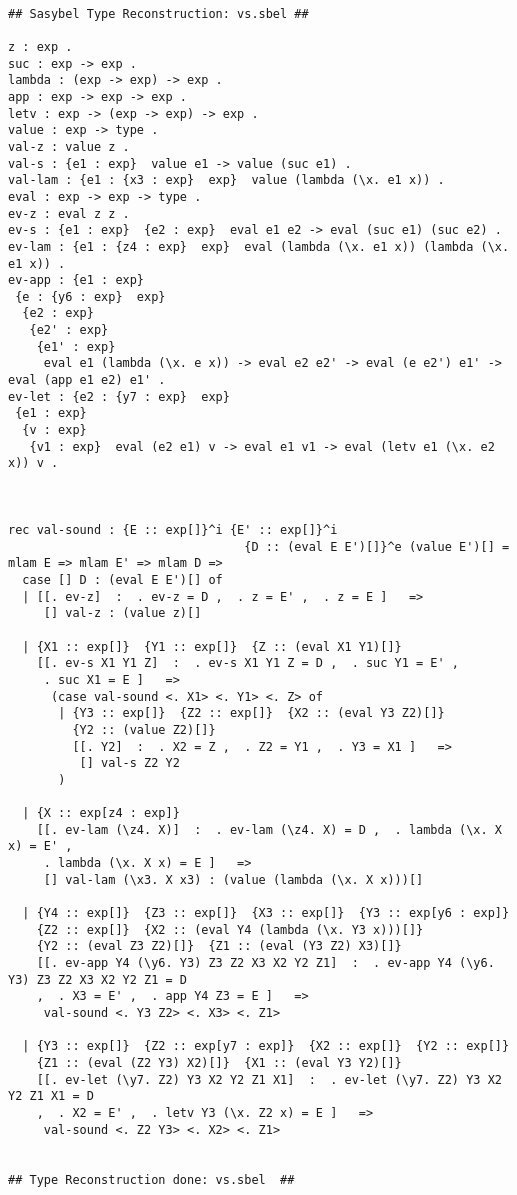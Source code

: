 \documentclass[12pt]{article}
\begin{document}
\footnotesize\begin{verbatim}

## Sasybel Type Reconstruction: vs.sbel ##

z : exp .
suc : exp -> exp .
lambda : (exp -> exp) -> exp .
app : exp -> exp -> exp .
letv : exp -> (exp -> exp) -> exp .
value : exp -> type .
val-z : value z .
val-s : {e1 : exp}  value e1 -> value (suc e1) .
val-lam : {e1 : {x3 : exp}  exp}  value (lambda (\x. e1 x)) .
eval : exp -> exp -> type .
ev-z : eval z z .
ev-s : {e1 : exp}  {e2 : exp}  eval e1 e2 -> eval (suc e1) (suc e2) .
ev-lam : {e1 : {z4 : exp}  exp}  eval (lambda (\x. e1 x)) (lambda (\x. e1 x)) .
ev-app : {e1 : exp}
 {e : {y6 : exp}  exp}
  {e2 : exp}
   {e2' : exp}
    {e1' : exp}
     eval e1 (lambda (\x. e x)) -> eval e2 e2' -> eval (e e2') e1' -> eval (app e1 e2) e1' .
ev-let : {e2 : {y7 : exp}  exp}
 {e1 : exp}
  {v : exp}
   {v1 : exp}  eval (e2 e1) v -> eval e1 v1 -> eval (letv e1 (\x. e2 x)) v .



rec val-sound : {E :: exp[]}^i {E' :: exp[]}^i
                                 {D :: (eval E E')[]}^e (value E')[] =
mlam E => mlam E' => mlam D =>
  case [] D : (eval E E')[] of
  | [[. ev-z]  :  . ev-z = D ,  . z = E' ,  . z = E ]   =>
     [] val-z : (value z)[]

  | {X1 :: exp[]}  {Y1 :: exp[]}  {Z :: (eval X1 Y1)[]}
    [[. ev-s X1 Y1 Z]  :  . ev-s X1 Y1 Z = D ,  . suc Y1 = E' ,
     . suc X1 = E ]   =>
      (case val-sound <. X1> <. Y1> <. Z> of
       | {Y3 :: exp[]}  {Z2 :: exp[]}  {X2 :: (eval Y3 Z2)[]}
         {Y2 :: (value Z2)[]}
         [[. Y2]  :  . X2 = Z ,  . Z2 = Y1 ,  . Y3 = X1 ]   =>
          [] val-s Z2 Y2
       )

  | {X :: exp[z4 : exp]}
    [[. ev-lam (\z4. X)]  :  . ev-lam (\z4. X) = D ,  . lambda (\x. X x) = E' ,
     . lambda (\x. X x) = E ]   =>
     [] val-lam (\x3. X x3) : (value (lambda (\x. X x)))[]

  | {Y4 :: exp[]}  {Z3 :: exp[]}  {X3 :: exp[]}  {Y3 :: exp[y6 : exp]}
    {Z2 :: exp[]}  {X2 :: (eval Y4 (lambda (\x. Y3 x)))[]}
    {Y2 :: (eval Z3 Z2)[]}  {Z1 :: (eval (Y3 Z2) X3)[]}
    [[. ev-app Y4 (\y6. Y3) Z3 Z2 X3 X2 Y2 Z1]  :  . ev-app Y4 (\y6. Y3) Z3 Z2 X3 X2 Y2 Z1 = D
    ,  . X3 = E' ,  . app Y4 Z3 = E ]   =>
     val-sound <. Y3 Z2> <. X3> <. Z1>

  | {Y3 :: exp[]}  {Z2 :: exp[y7 : exp]}  {X2 :: exp[]}  {Y2 :: exp[]}
    {Z1 :: (eval (Z2 Y3) X2)[]}  {X1 :: (eval Y3 Y2)[]}
    [[. ev-let (\y7. Z2) Y3 X2 Y2 Z1 X1]  :  . ev-let (\y7. Z2) Y3 X2 Y2 Z1 X1 = D
    ,  . X2 = E' ,  . letv Y3 (\x. Z2 x) = E ]   =>
     val-sound <. Z2 Y3> <. X2> <. Z1>


## Type Reconstruction done: vs.sbel  ##

\end{verbatim}
\end{document}
